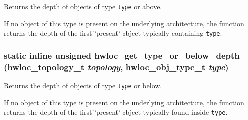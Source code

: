 Returns the depth of objects of type {\tt type} or above. 

If no object of this type is present on the underlying architecture, the function returns the depth of the first \char`\"{}present\char`\"{} object typically containing {\tt type}. \hypertarget{group__hwlocality__helper__types_ga0835c86ef2ce8c62637d61a1cf134f9}{
\subsubsection[{hwloc\_\-get\_\-type\_\-or\_\-below\_\-depth}]{\setlength{\rightskip}{0pt plus 5cm}static inline unsigned hwloc\_\-get\_\-type\_\-or\_\-below\_\-depth ({\bf hwloc\_\-topology\_\-t} {\em topology}, \/  {\bf hwloc\_\-obj\_\-type\_\-t} {\em type})}}
\label{group__hwlocality__helper__types_ga0835c86ef2ce8c62637d61a1cf134f9}


Returns the depth of objects of type {\tt type} or below. 

If no object of this type is present on the underlying architecture, the function returns the depth of the first \char`\"{}present\char`\"{} object typically found inside {\tt type}. 
